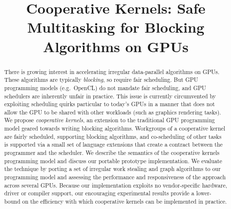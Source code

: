 \documentclass[numbers,nocopyrightspace,10pt]{sigplanconf}
\begin{document}
\title{Cooperative Kernels: Safe Multitasking for Blocking Algorithms on GPUs}

%
%

\authorinfo{}
{\makebox{} \\
}
{}




\maketitle

\begin{abstract}
There is growing interest in accelerating irregular data-parallel
algorithms on GPUs.  These algorithms are typically \emph{blocking},
so require fair scheduling.  But GPU programming models (e.g.\ OpenCL)
do not mandate fair scheduling, and GPU schedulers are inherently
unfair in practice.  This issue is currently circumvented by
exploiting scheduling quirks particular to today's GPUs in a manner
that does not allow the GPU to be shared with other workloads (such as
graphics rendering tasks).  We propose \emph{cooperative kernels}, an
extension to the traditional GPU programming model geared towards
writing blocking algorithms.  Workgroups of a cooperative kernel are
fairly scheduled, supporting blocking algorithms, and co-scheduling of
other tasks is supported via a small set of language extensions that
create a contract between the programmer and the scheduler.  We
describe the semantics of the cooperative kernels programming model
and discuss our portable prototype implementation.  We evaluate the
technique by porting a set of irregular work stealing and graph
algorithms to our programming model and assessing the performance and
responsiveness of the approach across several GPUs.  Because our
implementation exploits no vendor-specific hardware, driver or
compiler support, our encouraging experimental results provide a
lower-bound on the efficiency with which cooperative kernels can be
implemented in practice.

\end{abstract}
    
\end{document}
